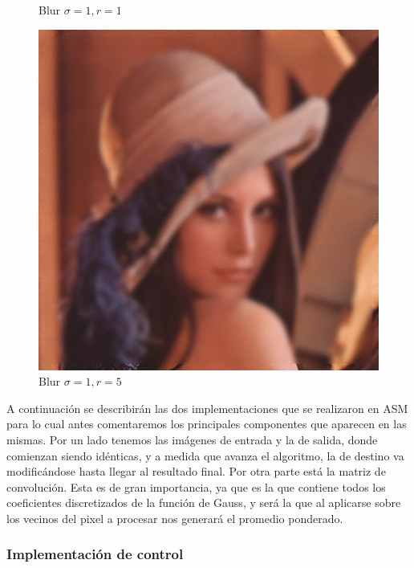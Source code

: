 \begin{figure}[H]
\begin{minipage}{.3\textwidth}
		\caption{Blur  $\sigma = 1, r = 1$}
		\label{fig:blur_s1_r1}
	\end{minipage}\hfill
	\begin{minipage}{.3\textwidth}
		\centering
		\includegraphics[width=\linewidth]{blur_s1_r5.jpg}
		\caption{Blur $\sigma = 1, r = 5$}
		\label{fig:blur_s1_r5}
	\end{minipage}
\end{figure}


A continuación se describirán las dos implementaciones que se realizaron en ASM
para lo cual antes comentaremos los principales componentes que aparecen
en las mismas. Por un lado tenemos las imágenes de entrada y la de salida, donde
comienzan siendo idénticas, y a medida que avanza el algoritmo, la de destino va
modificándose hasta llegar al resultado final. Por otra parte está la matriz de
convolución. Esta es de gran importancia, ya que es la que contiene todos los
coeficientes discretizados de la función de Gauss, y será la que al aplicarse
sobre los vecinos del pixel a procesar nos generará el promedio ponderado.

\subsubsection{Implementación de control}

